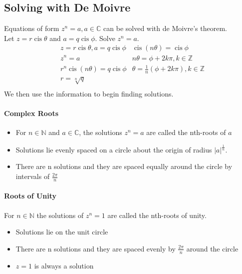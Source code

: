 \documentclass[a4paper,twoside,10pt]{article}
\DeclareMathOperator\cis{cis}
\newenvironment{example}[1]{%
	\mbox{}\\\tcolorbox[beamer,breakable,%
		title=Example: #1,standard jigsaw,opacityback=0, colframe=blue!75!black, boxrule=2pt]}{\endtcolorbox\mbox{}\\}
\begin{document}
		\subsection{Solving with De Moivre}
			Equations of form $z^n=a,a\in\mathbb{C}$ can be solved with de Moivre's theorem.
			\begin{example}{de Moivre's theorem to solve basic case}
				Let $z=r\cis\theta$ and $a=q\cis\phi$. Solve $z^n=a$.
				\begin{align*}
					&z=r\cis\theta,a=q\cis\phi &\cis(n\theta)=\cis\phi\\
					&z^n=a &n\theta=\phi+2k\pi,k\in\mathbb{Z}\\
					&r^n\cis(n\theta)=q\cis\phi &\theta=\frac{1}{n} (\phi+2k\pi),k\in\mathbb{Z}\\
					&r=\sqrt[n]{q}\\
				\end{align*}
				We then use the information to begin finding solutions.
			\end{example}
		
			\paragraph{Complex Roots}
			\begin{itemize}
				\item For $n\in\mathbb{N}$ and $a\in\mathbb{C}$, the solutions $z^n=a$ are called the nth-roots of $a$
				\item Solutions lie evenly spaced on a circle about the origin of radius $|a|^{\frac{1}{n}}$.
				\item There are n solutions and they are spaced equally around the circle by intervals of $\frac{2\pi}{n}$
			\end{itemize}
			
			\paragraph{Roots of Unity} For $n\in\mathbb{N}$ the solutions of $z^n=1$ are called the nth-roots of unity.
			\begin{itemize}
				\item Solutions lie on the unit circle
				\item There are n solutions and they are spaced evenly by $\frac{2\pi}{n}$ around the circle
				\item $z=1$ is always a solution
			\end{itemize}
		
\end{document}
